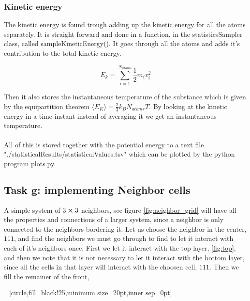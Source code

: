 \documentclass[11pt]{article}
\begin{document}
	\subsubsection{Kinetic energy}

		The kinetic energy is found trough adding up the kinetic energy for all the atoms separately. It is straight forward and done in a function, in the statisticsSampler class, called sampleKineticEnergy(). It goes through all the atoms and adds it's contribution to the total kinetic energy. 

		\[
		E_k = \sum\limits^{N_{atoms}}_{i=1}{\frac{1}{2}m_i v_i^2}
		\]

		\noindent Then it also stores the instantaneous temperature of the substance which is given by the equipartition theorem \( \langle E_K \rangle = \frac{2}{3} k_B N_{atoms} T \). By looking at the kinetic energy in a time-instant instead of averaging it we get an instantaneous temperature.
\\ \\
		\noindent All of this is stored together with the potential energy to a text file "./statisticalResults/statisticalValues.tsv" which can be plotted by the python program plots.py.

\subsection{Task g: implementing Neighbor cells}
	A simple system of \(3\cross 3\) neighbors, see figure \ref{fig:neighbor_grid} will have all the properties and connections of a larger system, since a neighbor is only connected to the neighbors bordering it. Let us choose the neighbor in the center, \(111\),  and find the neighbors we must go through to find to let it interact with each of it's neighbors once. First we let it interact with the top layer, \ref{fig:top}, and then we note that it is not necessary to let it interact with the bottom layer, since all the cells in that layer will interact with the choosen cell, \(111\). Then we fill the remainer of the front, 

	=[circle,fill=black!25,minimum size=20pt,inner sep=0pt]
\end{document}
